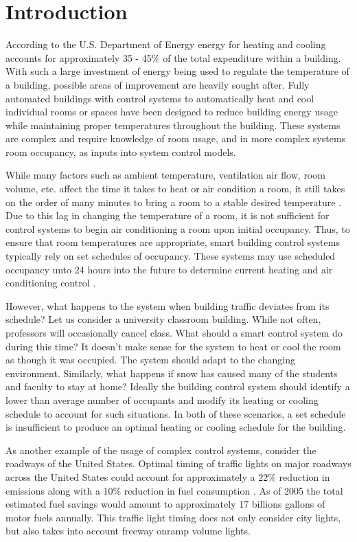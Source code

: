 \chapter{Introduction}
According to the U.S. Department of Energy \cite{DOE2010} energy for heating and cooling accounts for approximately 35 - 45\% of the total expenditure within a building.  With such a large investment of energy being used to regulate the temperature of a building, possible areas of improvement are heavily sought after.  Fully automated buildings with control systems to automatically heat and cool individual rooms or spaces have been designed \cite{Controls2013, Controls2013a} to reduce building energy usage while maintaining proper temperatures throughout the building.  These systems are complex and require knowledge of room usage, and in more complex systems room occupancy, as inputs into system control models.
	
While many factors such as ambient temperature, ventilation air flow, room volume, etc. affect the time it takes to heat or air condition a room, it still takes on the order of many minutes to bring a room to a stable desired temperature \cite{yang2004}.  Due to this lag in changing the temperature of a room, it is not sufficient for control systems to begin air conditioning a room upon initial occupancy.   Thus, to ensure that room temperatures are appropriate, smart building control systems typically rely on set schedules of occupancy.  These systems may use scheduled occupancy unto 24 hours into the future to determine current heating and air conditioning control \cite{Ma2010}.  

However, what happens to the system when building traffic deviates from its schedule?  Let us consider a university classroom building.  While not often, professors will occasionally cancel class.  What should a smart control system do during this time?  It doesn't make sense for the system to heat or cool the room as though it was occupied.  The system should adapt to the changing environment.  Similarly, what happens if snow has caused many of the students and faculty to stay at home?  Ideally the building control system should identify a lower than average number of occupants and modify its heating or cooling schedule to account for such situations.  In both of these scenarios, a set schedule is insufficient to produce an optimal heating or cooling schedule for the building.

As another example of the usage of complex control systems, consider the roadways of the United States.  Optimal timing of traffic lights on major roadways across the United States could account for approximately a 22\% reduction in emissions along with a 10\% reduction in fuel consumption \cite{DOT2007}.  As of 2005 the total estimated fuel savings would amount to approximately 17 billions gallons of motor fuels annually.  This traffic light timing does not only consider city lights, but also takes into account freeway onramp volume lights.

